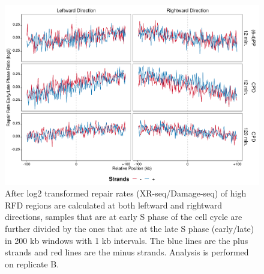 \begin{figure}[H]
\begin{center}
\includegraphics[width=\textwidth]{Chapters/7_appendix/figures/supfig71}
\caption[Repair rate early/late ratio of high RFDs in 200 kb (replicate B).]{After log2 transformed repair rates (XR-seq/Damage-seq) of high RFD regions are calculated at both leftward and rightward directions, samples that are at early S phase of the cell cycle are further divided by the ones that are at the late S phase (early/late) in 200 kb windows with 1 kb intervals. The blue lines are the plus strands and red lines are the minus strands. Analysis is performed on replicate B.}
\label{supfig:rrel200rfdB}
\end{center}
\end{figure}

